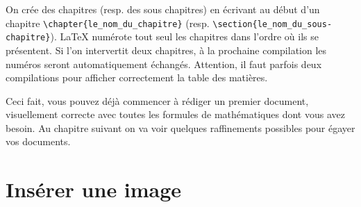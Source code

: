 On crée  des chapitres (resp. des sous chapitres) en écrivant au début d'un chapitre 
\lstinline+\chapter{le_nom_du_chapitre}+ 
(resp. \lstinline+\section{le_nom_du_sous-chapitre}+).  
\LaTeX{} numérote tout seul les chapitres dans l'ordre où ils se présentent. 
Si l'on intervertit deux chapitres, à la prochaine compilation les numéros seront automatiquement 
échangés. Attention, il faut parfois deux compilations pour afficher correctement la table des matières.  \medskip
 
Ceci fait, vous pouvez déjà commencer à rédiger un premier document, visuellement correcte avec
toutes les formules de mathématiques dont vous avez besoin. Au chapitre suivant on va voir 
quelques raffinements possibles pour égayer vos documents.



\section{Insérer une image }

